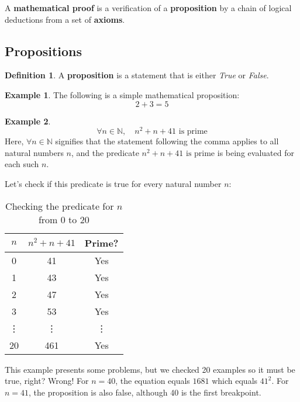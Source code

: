 \documentclass[11pt]{article}
\theoremstyle{definition}
\newtheorem{definition}{Definition}
\newtheorem{example}{Example}
\begin{document}
A \textbf{mathematical proof} is a verification of a \textbf{proposition} by a chain of logical deductions from a set of \textbf{axioms}.

\subsection{Propositions}

\begin{definition}
A \textbf{proposition} is a statement that is either \textit{True} or \textit{False}.
\end{definition}

\begin{example}
  The following is a simple mathematical proposition:
  \[
  2 + 3 = 5
  \]
\end{example}
  
\begin{example}
  \[
  \forall n \in \mathbb{N}, \quad n^2 + n + 41 \text{ is prime}
  \]
  Here, \(\forall n \in \mathbb{N}\) signifies that the statement following the comma applies to all natural numbers \( n \), and the predicate \( n^2 + n + 41 \text{ is prime}\) is being evaluated for each such \( n \).
\end{example}
  
\begin{center}
Let's check if this predicate is true for every natural number \( n \):
\begin{table}[h!]
\centering
\begin{tabular}{c c c}
\toprule
\(n\) & \(n^2 + n + 41\) & Prime? \\
\midrule
0 & 41 & Yes \\
1 & 43 & Yes \\
2 & 47 & Yes \\
3 & 53 & Yes \\
\vdots & \vdots & \vdots \\
20 & 461 & Yes \\
\bottomrule
\end{tabular}
\caption{Checking the predicate for \(n\) from 0 to 20}\label{tab:predicate_check}
\end{table}
\end{center}

This example presents some problems, but we checked 20 examples so it must be true, right? Wrong! For \( n = 40 \), the equation equals \( 1681 \) which equals \( 41^2 \). For \( n = 41 \), the proposition is also false, although 40 is the first breakpoint.
\end{document}

